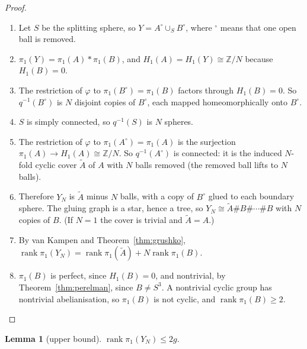 \documentclass[11pt]{article}
\newtheorem{lemma}[theorem]{Lemma}
\theoremstyle{definition}
\newcommand{\Z}{\mathbb{Z}}
\newcommand{\rk}{\operatorname{rank}}
\begin{document}
\begin{proof}
\begin{enumerate}[leftmargin=*]
\item Let $S$ be the splitting sphere, so $Y=A^\circ\cup_S B^\circ$, where $^\circ$ means that one open ball is removed.
\item $\pi_1(Y)=\pi_1(A)*\pi_1(B)$, and $H_1(A)=H_1(Y)\cong\Z/N$ because $H_1(B)=0$.
\item The restriction of $\varphi$ to $\pi_1(B^\circ)=\pi_1(B)$ factors through $H_1(B)=0$. So $q^{-1}(B^\circ)$ is $N$ disjoint copies of $B^\circ$, each mapped homeomorphically onto $B^\circ$.
\item $S$ is simply connected, so $q^{-1}(S)$ is $N$ spheres.
\item The restriction of $\varphi$ to $\pi_1(A^\circ)=\pi_1(A)$ is the surjection $\pi_1(A)\to H_1(A)\cong\Z/N$. So $q^{-1}(A^\circ)$ is connected: it is the induced $N$-fold cyclic cover $\tilde A$ of $A$ with $N$ balls removed (the removed ball lifts to $N$ balls).
\item Therefore $Y_N$ is $\tilde A$ minus $N$ balls, with a copy of $B^\circ$ glued to each boundary sphere. The gluing graph is a star, hence a tree, so $Y_N\cong\tilde A\#B\#\cdots\#B$ with $N$ copies of $B$. (If $N=1$ the cover is trivial and $\tilde A=A$.)
\item By van Kampen and Theorem~\ref{thm:grushko}, $\rk\pi_1(Y_N)=\rk\pi_1(\tilde A)+N\rk\pi_1(B)$.
\item $\pi_1(B)$ is perfect, since $H_1(B)=0$, and nontrivial, by Theorem~\ref{thm:perelman}, since $B\ne S^3$. A nontrivial cyclic group has nontrivial abelianisation, so $\pi_1(B)$ is not cyclic, and $\rk\pi_1(B)\ge2$.\qedhere
\end{enumerate}
\end{proof}

\begin{lemma}[upper bound]\label{lem:upper}
$\rk\pi_1(Y_N)\le 2g$.
\end{lemma}
\end{document}
